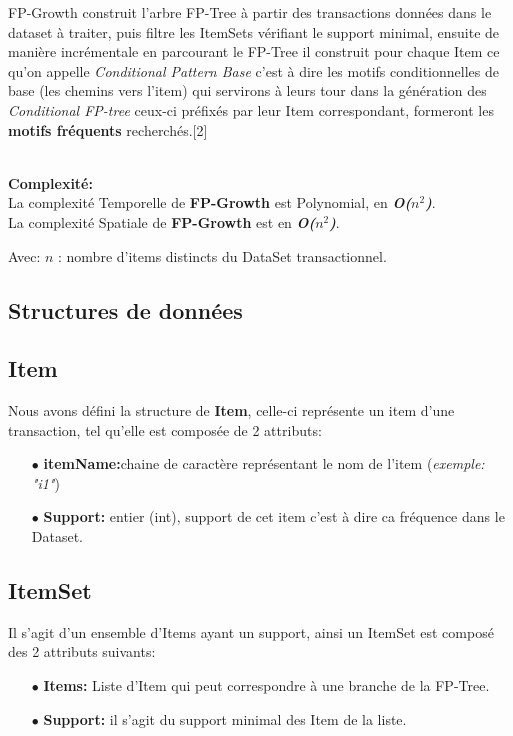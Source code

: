 \documentclass[12pt,a4paper,oneside]{book}
\begin{document}
	FP-Growth construit l'arbre FP-Tree à partir des transactions données dans le dataset à traiter, puis filtre les ItemSets vérifiant le support minimal, ensuite de manière incrémentale en parcourant le FP-Tree il construit pour chaque Item ce qu'on appelle \textit{Conditional Pattern Base} c'est à dire les motifs conditionnelles de base (les chemins vers l'item) qui servirons à leurs tour dans la génération des \textit{Conditional FP-tree} ceux-ci préfixés par leur Item correspondant, formeront les \textbf{motifs fréquents} recherchés.[2] 
	
	
	\textbf{ }\\
	\textbf{Complexité:}\\
	La complexité Temporelle de \textbf{FP-Growth} est Polynomial,  en \textbf{\textit{O($n^2$)}}.\\
	La complexité Spatiale  de \textbf{FP-Growth} est en \textbf{\textit{O($n^2$)}}.
	
	
	Avec: $n$ : nombre d'items distincts du DataSet transactionnel.
	
	\subsection{Structures de données}
	
	\subsection*{Item}
	Nous avons défini la structure de \textbf{Item}, celle-ci représente un item d'une transaction, tel qu'elle est composée de 2 attributs:
	\begin{itemize}
		\item[$\bullet$] \textbf{itemName:}chaine de caractère représentant le nom de l'item (\textit{exemple: "i1"})
		\item[$\bullet$] \textbf{Support:} entier (int), support de cet item c'est à dire ca fréquence dans le Dataset.
	\end{itemize}
	
	
	\subsection*{ItemSet}
	Il s'agit d'un ensemble d'Items ayant un support, ainsi un ItemSet est composé des 2 attributs suivants:
	\begin{itemize}
		\item[$\bullet$] \textbf{Items:} Liste d'Item qui peut correspondre à une branche de la FP-Tree.
		\item[$\bullet$] \textbf{Support:} il s'agit du support minimal des Item de la liste.
	\end{itemize}
	
\end{document}
